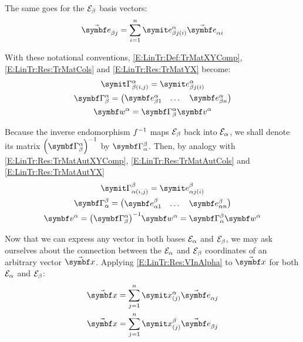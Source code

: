 The same goes for the $\basis[\beta]$ basis vectors:
\begin{equation} \label{E:LinTr:Res:BetaInAlpha}
\vasub{\bv}{\beta j}=\sum_{i=1}^{n} \csubprj{\bv}{\beta j}{\alpha}{i} \vasub{\bv}{\alpha i}
\end{equation}

With these notational conventions, \eqref{E:LinTr:Def:TrMatXYComp}, \eqref{E:LinTr:Res:TrMatCols} and \eqref{E:LinTr:Res:TrMatYX} become:
\begin{gather}
\cAut{\alpha}{\beta}{i,j}= \csubprj{\bv}{\beta j}{\alpha}{i} \label{E:LinTr:Res:TrMatAutXYComp} \\
\AutM{\alpha}{\beta} =  \matenv{\vsubprj{\bv}{\beta 1}{\alpha} & \dots & \vsubprj{\bv}{\beta n}{\alpha}} \label{E:LinTr:Res:TrMatAutCols} \\
\vprj{w}{\alpha} = \AutM{\alpha}{\beta} \vprj{v}{\alpha} \label{E:LinTr:Res:TrMatAutYX}
\end{gather}

Because the inverse endomorphism $\inv{f}$ maps $\basis[\beta]$ back into $\basis[\alpha]$, we shall denote its matrix $\invp{\AutM{\alpha}{\beta}}$ by $\AutM{\beta}{\alpha}$.  Then, by analogy with \eqref{E:LinTr:Res:TrMatAutXYComp}, \eqref{E:LinTr:Res:TrMatAutCols} and \eqref{E:LinTr:Res:TrMatAutYX}
\begin{gather}
\cAut{\beta}{\alpha}{i,j}= \csubprj{\bv}{\alpha j}{\beta}{i} \label{E:LinTr:Res:TrMatInvAutXYComp} \\
\AutM{\beta}{\alpha} =  \matenv{\vsubprj{\bv}{\alpha 1}{\beta} & \dots & \vsubprj{\bv}{\alpha n}{\beta}} \label{E:LinTr:Res:TrMatInvAutCols} \\
\vprj{v}{\alpha} = \invp{\AutM{\alpha}{\beta}} \vprj{w}{\alpha} = \AutM{\beta}{\alpha} \vprj{w}{\alpha} \label{E:LinTr:Res:TrMatInvAutXY}
\end{gather}

Now that we can express any vector in both bases $\basis[\alpha]$ and $\basis[\beta]$, we may ask ourselves about the connection between the $\basis[\alpha]$ and $\basis[\beta]$ coordinates of an arbitrary vector $\vabs{x}$. Applying \eqref{E:LinTr:Res:VInAlpha} to $\vabs{x}$ for both $\basis[\alpha]$ and $\basis[\beta]$:
\begin{gather} 
\vabs{x}=\sum_{j=1}^{n} \cprj{x}{\alpha}{j} \vasub{\bv}{\alpha j} \label{E:LinTr:Res:XInAlpha} \\
\vabs{x}=\sum_{j=1}^{n} \cprj{x}{\beta}{j} \vasub{\bv}{\beta j} \label{E:LinTr:Res:XInBeta}
\end{gather}

